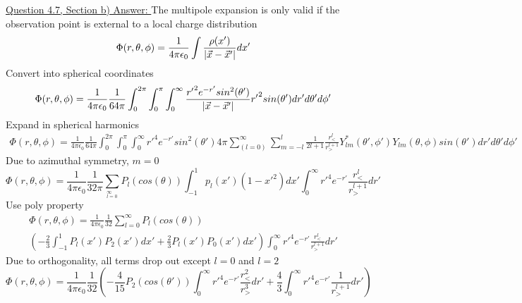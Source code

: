 \documentclass[12pt]{article}
\begin{document}
    \underline{Question 4.7, Section b) Answer: }
    \newline The multipole expansion is only valid if the observation point is external to a local charge distribution
    \begin{equation} \label{eq: 4.2.1}
        \Phi(r,\theta,\phi) = \frac{1}{4 \pi \epsilon_0} \int \frac{\rho(x')}{\abs{\vec{x} - \vec{x}'}} dx'
    \end{equation}
    Convert into spherical coordinates
    \begin{equation} \label{eq: 4.2.2}
        \Phi(r,\theta,\phi) = \frac{1}{4 \pi \epsilon_0} \frac{1}{64 \pi} \int_0^{2\pi} \int_0^{\pi} \int_0^\infty \frac{{r'}^2 e^{-r'} sin^2(\theta')}{\abs{\vec{x} - \vec{x}'}} {r'}^2 sin(\theta') dr' d\theta' d\phi'
    \end{equation}
    Expand in spherical harmonics
    \begin{equation} \label{eq: 4.2.3}
        \begin{split}
        \Phi(r,\theta,\phi) = \frac{1}{4 \pi \epsilon_0} \frac{1}{64 \pi} \int_0^{2\pi} \int_0^{\pi} \int_0^\infty {r'}^4 e^{-r'} sin^2(\theta') 4 \pi \sum_(l=0)^\infty \sum_{m=-l}^l \frac{1}{2l+1} \frac{r_<^l}{r_>^{l+1}} Y_{lm}^*(\theta',\phi') Y_{lm}(\theta, \phi) sin(\theta') dr' d\theta' d\phi'
        \end{split}
    \end{equation}
    Due to azimuthal symmetry, $m=0$
    \begin{equation} \label{eq: 4.2.4}
        \Phi(r,\theta,\phi) = \frac{1}{4 \pi \epsilon_0} \frac{1}{32 \pi} \sum__{l=0}^\infty P_l(cos(\theta)) \int_{-1}^1 p_l(x') (1-{x'}^2) dx' \int_0^\infty {r'}^4 e^{-r'} \frac{r_<^l}{r_>^{l+1}} dr'
    \end{equation}
    Use poly property
    \begin{equation} \label{eq: 4.2.5}
        \begin{split}
        \Phi(r,\theta, \phi) = \frac{1}{4 \pi \epsilon_0} \frac{1}{32} \sum_{l=0}^\infty P_l(cos(\theta)) 
        \\ \left(-\frac{2}{3} \int_{-1}^1 P_l(x') P_2(x') dx' + \frac{2}{3} P_l(x') P_0(x') dx' \right) \int_0^\infty {r'}^4 e^{-r'} \frac{r_<^l}{r_>^{l+1}} dr'
        \end{split}
    \end{equation}
    Due to orthogonality, all terms drop out except $l=0$ and $l=2$
    \begin{equation} \label{eq: 4.2.6}
        \Phi(r,\theta, \phi) = \frac{1}{4 \pi \epsilon_0} \frac{1}{32} \left(-\frac{4}{15} P_2(cos(\theta')) \int_{0}^\infty {r'}^4 e^{-r'} \frac{r_<^2}{r_>^3} dr' + \frac{4}{3} \int_0^\infty {r'}^4 e^{-r'} \frac{1}{r_>^{l+1}} dr' \right)
    \end{equation}
\end{document}
